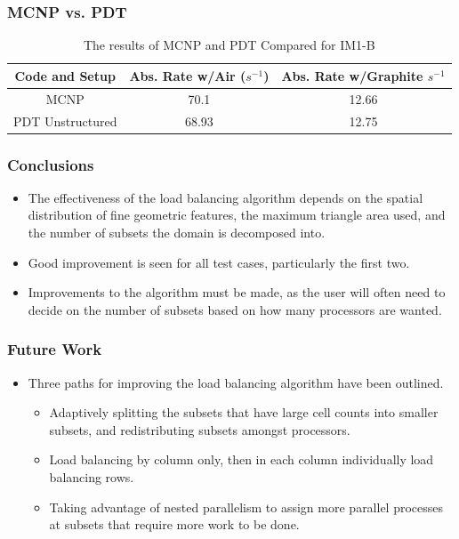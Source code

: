 \documentclass[]{beamer}
\begin{document}
\begin{frame}[t]\frametitle{MCNP vs. PDT}
\begin{table}[H]
\centering
\small
\caption{The results of MCNP and PDT Compared for IM1-B}
\begin{tabular}{c | c | c}
\hline
\textbf{Code and Setup} & Abs. Rate w/Air ($s^{-1}$) & Abs. Rate w/Graphite $s^{-1}$\\
\hline
MCNP & 70.1 & 12.66 \\
PDT Unstructured & 68.93 & 12.75 \\
\hline

\end{tabular}
\end{table}
\end{frame}



\begin{frame}[t]\frametitle{Conclusions}
\begin{block}{}
\begin{itemize}
\item The effectiveness of the load balancing algorithm depends on the spatial distribution of fine geometric features, the maximum triangle area used, and the number of subsets the domain is decomposed into.
\item Good improvement is seen for all test cases, particularly the first two. 
\item Improvements to the algorithm must be made, as the user will often need to decide on the number of subsets based on how many processors are wanted. 
\end{itemize}
\end{block}
\end{frame}

\begin{frame}[t]\frametitle{Future Work}
\begin{block}{}
\begin{itemize}
\item Three paths for improving the load balancing algorithm have been outlined.
\begin{itemize} 
\item Adaptively splitting the subsets that have large cell counts into smaller subsets, and redistributing subsets amongst processors.
\item Load balancing by column only, then in each column individually load balancing rows. 
\item Taking advantage of nested parallelism to assign more parallel processes at subsets that require more work to be done.
\end{itemize}
\end{itemize}
\end{block}
\end{frame}
\end{document}
